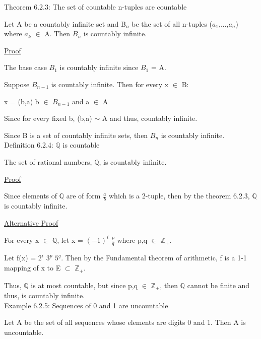 \newpage

{ \color{red} Theorem 6.2.3: The set of countable n-tuples are countable } 

	\begin{adjustbox}{minipage=14cm, right, vspace=0.1cm 0cm}
		Let A be a countably infinite set and B$_n$ be the set of all
		n-tuples ($a_1$,...,$a_n$) where $a_k$ $\in$ A.
		Then $B_n$ is countably infinite.
	\end{adjustbox}

{ \color{magenta} \underline{Proof} } 
	
	The base case $B_1$ is countably infinite since $B_1$ = A.

	Suppose $B_{n-1}$ is countably infinite. Then for every x $\in$ B:

	\qquad x = (b,a) \qquad \qquad b $\in$ $B_{n-1}$ and a $\in$ A

	Since for every fixed b, (b,a) $\sim$ A and thus, countably infinite.

	Since B is a set of countably infinite sets, then $B_{n}$
	is countably infinite. \\

{ \color{blue} Definition 6.2.4: $\mathbb{Q}$ is countable } 

	\begin{adjustbox}{minipage=14cm, right, vspace=0.1cm 0cm}
		The set of rational numbers, $\mathbb{Q}$, is countably infinite.
	\end{adjustbox}

{ \color{magenta} \underline{Proof} } 
	
	Since elements of $\mathbb{Q}$ are of form $\frac{a}{b}$ which is a
	2-tuple, then by the {\color{red} theorem 6.2.3}, $\mathbb{Q}$ is countably infinite.

{ \color{magenta} \underline{Alternative Proof} } 
	
	For every x $\in$ $\mathbb{Q}$, let x = $(-1)^i$ $\frac{p}{q}$ where p,q $\in$ $\mathbb{Z}_+$.

	Let f(x) = $2^i$ $3^p$ $5^q$. Then by the Fundamental theorem of arithmetic,
	f is a 1-1 mapping of x to E $\subset$ $\mathbb{Z}_+$.

	Thus, $\mathbb{Q}$ is at most countable, but since p,q $\in$ $\mathbb{Z}_+$,
	then $\mathbb{Q}$ cannot be finite and thus, is countably infinite. \\

{ \color{purple} Example 6.2.5: Sequences of 0 and 1 are uncountable } 

	\begin{adjustbox}{minipage=14cm, right, vspace=0.1cm 0cm}
		Let A be the set of all sequences whose elements are digits 0 and 1.
		Then A is uncountable.
	\end{adjustbox}

